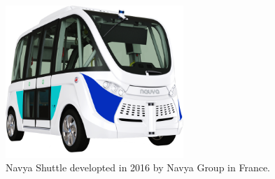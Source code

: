 \begin{figure}[!h]
	\centering
	\includegraphics[width=0.6\textwidth]{../figure/veiculos5.png}
	\caption{Navya Shuttle developted in 2016 by Navya Group in France.}
	\label{fig:veiculos5}
\end{figure}

